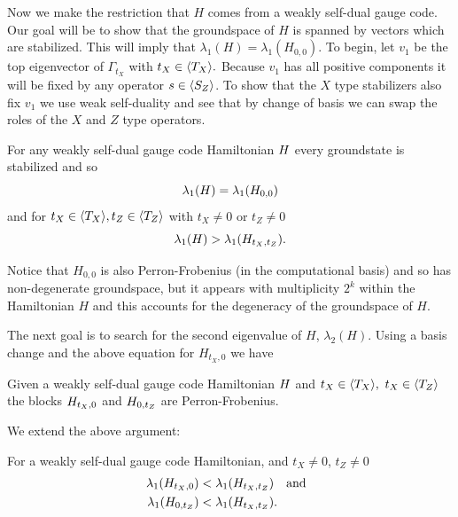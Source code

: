 Now we make the restriction that $H$
comes from a weakly self-dual gauge code.
Our goal will be to show that the
groundspace of $H$ is spanned
by vectors which are stabilized.
This will imply that $\lambda_1(H)=\lambda_1(H_{0,0}).$
To begin, let $v_1$ be the top
eigenvector of $\Gamma_{t_X}$ with $t_X\in\langle T_X \rangle.$
Because $v_1$ has all positive components
it will be fixed by  any operator
$s\in\langle S_Z \rangle$.
To show that the $X$ type stabilizers
also fix $v_1$ 
we use weak self-duality
and see that by change of basis
we can swap the roles of the $X$ and $Z$ type operators.
\begin{framed}

For any weakly self-dual gauge code Hamiltonian $H$
every groundstate is stabilized 
and so $$\lambda_1(H) = \lambda_1(H_{0,0})$$
and for $t_X\in\langle T_X \rangle, t_Z\in\langle T_Z \rangle$
with $t_X\ne 0$ or $t_Z\ne 0$
$$
\lambda_1(H) > \lambda_1(H_{t_X,t_Z}).
$$
\end{framed}
Notice that 
$H_{0,0}$ is also Perron-Frobenius (in the computational basis)
and so has non-degenerate
groundspace, but it appears with multiplicity $2^k$ within
the Hamiltonian $H$ and this accounts for the degeneracy of the
groundspace of $H$.



The next goal is to search for
the second eigenvalue of $H$,
$\lambda_2(H).$
Using a basis change and the
above equation for $H_{t_X,0}$
we have
\begin{framed}

Given a weakly self-dual
gauge code Hamiltonian $H$ and
$t_X\in \langle T_X \rangle,\  t_X\in \langle T_Z \rangle$
the blocks $H_{t_X,0}$ and 
$H_{0,t_Z}$ are Perron-Frobenius.
\end{framed}

We extend the above argument:
\begin{framed}
\noindent For a weakly self-dual gauge code
Hamiltonian,
and $t_X\ne 0$, $t_Z\ne 0$
\begin{align*}
\lambda_1(H_{t_X,0}) &< 
    \lambda_1(H_{t_X,t_Z}) \ \ \ \mbox{and}\ \ \\
\lambda_1(H_{0,t_Z}) &< 
    \lambda_1(H_{t_X,t_Z}).
\end{align*}
\end{framed}

